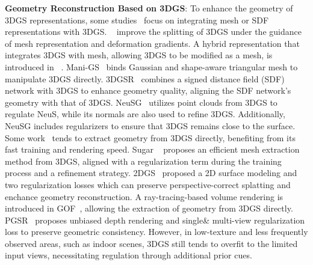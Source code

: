 \textbf{Geometry Reconstruction Based on 3DGS}: 
To enhance the geometry of 3DGS representations, 
some studies~\citep{gao2024mesh, waczynska2024games, lyu20243dgsr, chen2023neusg} 
focus on integrating mesh or SDF representations with 3DGS.
~\citep{gao2024mesh} improve the splitting of 3DGS under the guidance of
mesh representation and deformation gradients. 
%
A hybrid representation that integrates 3DGS with mesh, 
allowing 3DGS to be modified as a mesh, is introduced in 
~\citep{waczynska2024games}.
%
Mani-GS~\citep{gao2024mani} binds Gaussian and shape-aware triangular mesh to manipulate 3DGS directly.
%
3DGSR~\citep{lyu20243dgsr} combines a signed distance field (SDF) 
network with 3DGS to enhance geometry quality, 
aligning the SDF network’s geometry with that of 3DGS.
%
NeuSG~\citep{chen2023neusg} utilizes point clouds from 
3DGS to regulate NeuS, while its normals are also used 
to refine 3DGS. Additionally, NeuSG includes regularizers 
to ensure that 3DGS remains close to the surface.
%
Some work~\citep{guedon2023sugar, huang20242d, yu2024gaussian, chen2024pgsr} 
tends to extract geometry from 3DGS directly, benefiting from 
its fast training and rendering speed.
Sugar ~\citep{guedon2023sugar}
proposes an efficient mesh extraction method from 3DGS, aligned with
a regularization term during the training process and a refinement strategy.
%
2DGS~\citep{huang20242d} proposed a 2D surface modeling and two regularization 
losses which can preserve perspective-correct splatting and enchance geometry 
reconstruction.
%
A ray-tracing-based volume rendering is introduced in 
GOF~\citep{yu2024gaussian},
allowing the extraction of geometry from 3DGS directly.
%
PGSR~\citep{chen2024pgsr} proposes unbiased depth rendering
and single\& multi-view regularization loss to preserve 
geometric consistency.
%
However, in low-texture and less frequently observed areas, 
such as indoor scenes, 3DGS still tends to overfit to 
the limited input views, necessitating regulation 
through additional prior cues.

%

